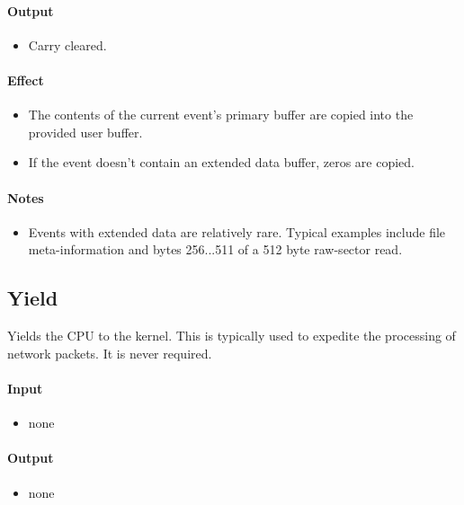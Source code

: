 \paragraph{Output}
\begin{itemize}
\item Carry cleared.
\end{itemize}

\paragraph{Effect}
\begin{itemize}
\item The contents of the current event's primary buffer are copied into the provided user buffer.
\item If the event doesn't contain an extended data buffer, zeros are copied.
\end{itemize}

\paragraph{Notes}
\begin{itemize}
\item Events with extended data are relatively rare.  Typical examples include file meta-information and bytes 256...511 of a 512 byte raw-sector read. 
\end{itemize}


\subsection*{Yield}
Yields the CPU to the kernel.  This is typically used to expedite the processing of network packets.  It is never required.

\paragraph{Input}
\begin{itemize}
\item none
\end{itemize}

\paragraph{Output}
\begin{itemize}
\item none
\end{itemize}

